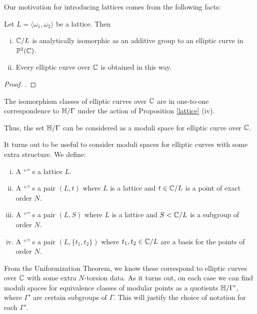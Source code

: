\documentclass[12pt, a4paper]{report}
\begin{document}
Our motivation for introducing lattices comes from the following facts:

\begin{prop}
  Let $L = \langle \omega_1, \omega_2 \rangle$ be a lattice. Then
  \begin{enumerate}[(i)]
  \item ${\mathbb C}/L$ is analytically isomorphic as an additive group
    to an elliptic curve in ${\mathbb P}^2({\mathbb C})$.
  \item Every elliptic curve over ${\mathbb C}$ is obtained in this way.
  \end{enumerate}
\end{prop}
\begin{proof}
  \cite[See][Pages 131-134 and 136-137]{Granville}.
\end{proof}

\begin{cor}
  The isomorphism classes of elliptic curves over ${\mathbb C}$ are in one-to-one
  correspondence to $\mathbb{H}/\Gamma$ under the action of Proposition
  \autoref{lattice} (iv).
\end{cor}

Thus, the set $\mathbb{H}/\Gamma$ can be considered as a moduli space for elliptic
curve over ${\mathbb C}$. 

\begin{defn}
  It turns out to be useful to consider moduli spaces for elliptic curves with
  some extra structure. We define: 
  \begin{enumerate}[(i)]
  \item A ``'' s a lattice $L$.
  \item A ``'' s a pair $(L,t)$ where $L$ is a
    lattice and $t \in {\mathbb C}/L$ is a point of exact order $N$.
  \item A ``'' s a pair $(L,S)$ where $L$ is a
    lattice and $S < {\mathbb C}/L$ is a subgroup of order $N$.
  \item A ``'' s a pair $(L, \{t_1,t_2\})$ where
    $t_1,t_2 \in {\mathbb C}/L$ are a basis for the points of order $N$.
  \end{enumerate}
\end{defn}

From the Uniformization Theorem, we know these correspond to elliptic curves
over ${\mathbb C}$ with some extra $N$-torsion data.
As it turns out, on each case we can find moduli spaces for equivalence classes of modular
points as a quotients $\mathbb{H} / \Gamma'$, where $\Gamma'$ are certain subgroups of
$\Gamma$. This will justify the choice of notation for each $\Gamma'.$
\end{document}
